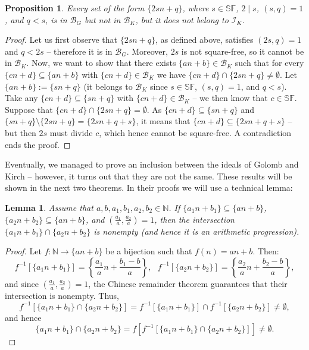\documentclass{amsart}
\newtheorem{lem}[thm]{Lemma}
\newtheorem{prop}[thm]{Proposition}
\theoremstyle{definition}
\newcommand{\N}{{\mathbb N}}
\newcommand{\I}{\mathcal I}
\newcommand{\B}{\mathcal{B}}
\newcommand{\SqrFr}{\mathbb{SF}}
\begin{document}
\begin{prop}
Every set of the form $\{2sn+q\}$, where $s \in\SqrFr$, $2\mid s$, $(s,q)=1$, and $q<s$, is in $\B_G$ but not in $\B_K$, but it does not belong to $\I_K$.
\end{prop}

\begin{proof}
Let us first observe that $\{2sn+q\}$, as defined above, satisfies $(2s,q)=1$ and $q<2s$ -- therefore it is in $\B_G$. Moreover, $2s$ is not square-free, so it cannot be in $\B_K$.
Now, we want to show that there exists $\{an+b\}\in \B_K$ such that for every $\{cn+d\}\subseteq \{an+b\}$ with $\{cn+d\}\in \B_K$ we have $\{cn+d\}\cap \{2sn+q\} \neq \emptyset$. Let $\{an+b\} := \{sn+q\}$ (it belongs to $\B_K$ since $s\in\SqrFr$, $(s,q)=1$, and $q<s$). Take any $\{cn+d\}\subseteq \{sn+q\}$ with $\{cn+d\}\in \B_K$ -- we then know that $c\in\SqrFr$. Suppose that $\{cn+d\}\cap \{2sn+q\} = \emptyset$. As $\{cn+d\}\subseteq \{sn+q\}$ and $\{sn+q\} \setminus \{2sn+q\} = \{2sn+q+s\}$, it means that $\{cn+d\}\subseteq \{2sn+q+s\}$ -- but then $2s$ must divide $c$, which hence cannot be square-free. A contradiction ends the proof.
\end{proof}

Eventually, we managed to prove an inclusion between the ideals of Golomb and Kirch -- however, it turns out that they are not the same. These results will be shown in the next two theorems. In their proofs we will use a technical lemma:
 
\begin{lem} \label{lemCRT}
Assume that $a,b,a_1,b_1,a_2,b_2 \in\N$. If $\{a_1 n+b_1\}\subseteq \{an+b\}$, $\{a_2 n+b_2\}\subseteq \{an+b\}$, and $\left(\frac{a_1}{a},\frac{a_2}{a}\right)=1$, then the intersection $\{a_1 n+b_1\}\cap\{a_2 n+b_2\}$ is nonempty (and hence it is an arithmetic progression). 
\end{lem}

\begin{proof}
Let $f\colon\N\to \{an+b\}$ be a bijection such that $f(n) = an+b$. Then: 
$$f^{-1}[\{a_1 n+b_1\}] = \left\{\frac{a_1}{a} n+\frac{b_1-b}{a}\right\},\ \ \ f^{-1}[\{a_2 n+b_2\}] = \left\{\frac{a_2}{a} n+\frac{b_2-b}{a}\right\},$$
and since $\left(\frac{a_1}{a},\frac{a_2}{a}\right)=1$, the Chinese remainder theorem guarantees that their intersection is nonempty. Thus,
$$f^{-1}[\{a_1 n+b_1\}\cap\{a_2 n+b_2\}] = f^{-1}[\{a_1 n+b_1\}]\cap f^{-1}[\{a_2 n+b_2\}]\neq\emptyset,$$
and hence
$$\{a_1 n+b_1\}\cap\{a_2 n+b_2\} = f[f^{-1}[\{a_1 n+b_1\}\cap\{a_2 n+b_2\}]] \neq\emptyset.$$
\end{proof}
\end{document}
